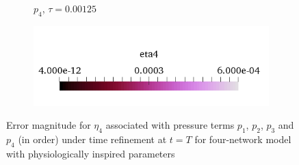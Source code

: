 \begin{figure}[h!]
\begin{subfigure}[b]{0.24\textwidth}
    \caption{$p_4$, $\tau=0.00125$}
  \end{subfigure}
  \begin{subfigure}[b]{0.5\textwidth}
    \includegraphics[width=\textwidth,height=\textheight,keepaspectratio,height=\textheight,keepaspectratio]{figures/4_mpet/biomedical/time/eta4_range.png}
  \end{subfigure}
  \caption{Error magnitude for $\eta_4$ associated with pressure terms $p_1$, $p_2$, $p_3$ and $p_4$ (in order) under time refinement at $t=T$ for four-network model with physiologically inspired parameters} \label{fig:mpet4_eta4}
\end{figure}
